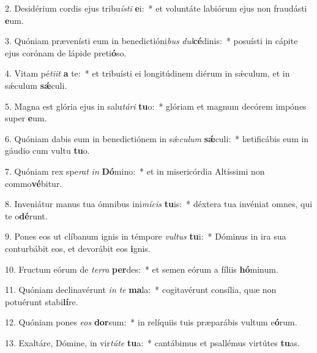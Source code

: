 2. Desidérium cordis ejus tribu\textit{ís}\textit{ti} \textbf{e}i:~*  et voluntáte labiórum ejus non fraudásti \textbf{e}um.\

3. Quóniam prævenísti eum in benedictióni\textit{bus} \textit{dul}\textbf{cé}dinis:~*  posuísti in cápite ejus corónam de lápide preti\textbf{ó}so.\

4. Vitam pé\textit{ti}\textit{it} \textbf{a} te:~*  et tribuísti ei longitúdinem diérum in sǽculum, et in sǽculum \textbf{sǽ}culi.\

5. Magna est glória ejus in salu\textit{tá}\textit{ri} \textbf{tu}o:~*  glóriam et magnum decórem impónes super \textbf{e}um.\

6. Quóniam dabis eum in benedictiónem in sǽ\textit{cu}\textit{lum} \textbf{sǽ}culi:~*  lætificábis eum in gáudio cum vultu \textbf{tu}o.\

7. Quóniam rex spe\textit{rat} \textit{in} \textbf{Dó}mino:~*  et in misericórdia Altíssimi non commo\textbf{vé}bitur.\

8. Inveniátur manus tua ómnibus ini\textit{mí}\textit{cis} \textbf{tu}is:~*  déxtera tua invéniat omnes, qui te o\textbf{dé}runt.\

9. Pones eos ut clíbanum ignis in témpore \textit{vul}\textit{tus} \textbf{tu}i:~*  Dóminus in ira sua conturbábit eos, et devorábit eos \textbf{i}gnis.\

10. Fructum eórum de \textit{ter}\textit{ra} \textbf{per}des:~*  et semen eórum a fíliis \textbf{hó}minum.\

11. Quóniam declinavérunt \textit{in} \textit{te} \textbf{ma}la:~*  cogitavérunt consília, quæ non potuérunt stabi\textbf{lí}re.\

12. Quóniam pones \textit{e}\textit{os} \textbf{dor}sum:~*  in relíquiis tuis præparábis vultum e\textbf{ó}rum.\

13. Exaltáre, Dómine, in vir\textit{tú}\textit{te} \textbf{tu}a:~*  cantábimus et psallémus virtútes \textbf{tu}as.\


